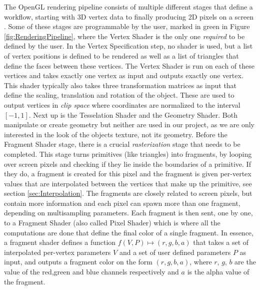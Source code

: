 The OpenGL rendering pipeline consists of multiple different stages that define a workflow, starting with 3D vertex data to finally producing 2D pixels on a screen \cite{a2019_rendering}. Some of these stages are programmable by the user, marked in green in Figure \ref{fig:RenderingPipeline}, where the Vertex Shader is the only one \textit{required} to be defined by the user. In the Vertex Specification step, no shader is used, but a list of vertex positions is defined to be rendered as well as a list of triangles that define the faces between these vertices. The Vertex Shader is run on each of these vertices and takes exactly one vertex as input and outputs exactly one vertex. This shader typically also takes three transformation matrices as input that define the scaling, translation and rotation of the object. These are used to output vertices in \textit{clip space} where coordinates are normalized to the interval $[-1,1]$. Next up is the Tesselation Shader and the Geometry Shader. Both manipulate or create geometry but neither are used in our project, as we are only interested in the look of the objects texture, not its geometry. Before the Fragment Shader stage, there is a crucial \textit{rasterization} stage that needs to be completed. This stage turns primitives (like triangles) into fragments, by looping over screen pixels and checking if they lie inside the boundaries of a primitive. If they do, a fragment is created for this pixel and the fragment is given per-vertex values that are interpolated between the vertices that make up the primitive, see section \ref{sec:Interpolation}. The fragments are closely related to screen pixels, but contain more information and each pixel can spawn more than one fragment, depending on multisampling parameters. Each fragment is then sent, one by one, to a Fragment Shader (also called Pixel Shader) which is where all the computations are done that define the final color of a single fragment. In essence, a fragment shader defines a function $f(V,P) \mapsto (r,g,b,a)$ that takes a set of interpolated per-vertex parameters $V$ and a set of user defined parameters $P$ as input, and outputs a fragment color on the form $(r,g,b,a)$, where $r$, $g$, $b$ are the value of the red,green and blue channels respectively and $a$ is the alpha value of the fragment.


